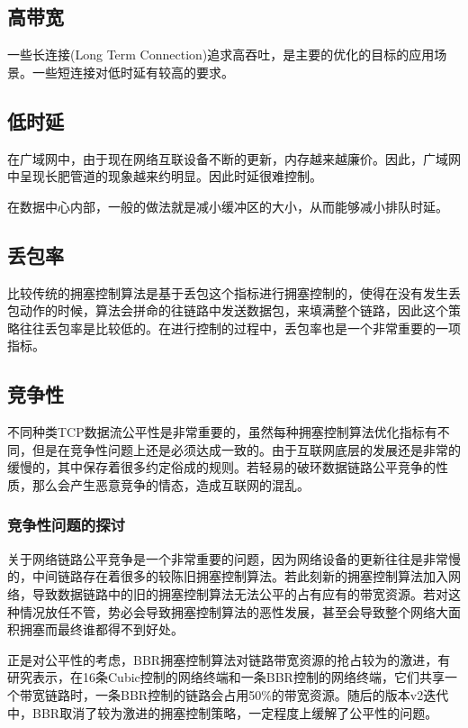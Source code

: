 \documentclass[a4paper, 12pt, UTF8]{ctexart}
\begin{document}
\subsection{高带宽}
\par 一些长连接(Long Term Connection)追求高吞吐，是主要的优化的目标的应用场景。一些短连接对低时延有较高的要求。
\subsection{低时延}
\par 在广域网中，由于现在网络互联设备不断的更新，内存越来越廉价。因此，广域网中呈现长肥管道的现象越来约明显。因此时延很难控制。

\par 在数据中心内部，一般的做法就是减小缓冲区的大小，从而能够减小排队时延。

\subsection{丢包率}
\par 比较传统的拥塞控制算法是基于丢包这个指标进行拥塞控制的，使得在没有发生丢包动作的时候，算法会拼命的往链路中发送数据包，来填满整个链路，因此这个策略往往丢包率是比较低的。在进行控制的过程中，丢包率也是一个非常重要的一项指标。

\subsection{竞争性}

\par 不同种类TCP数据流\cite{DBLP:conf/imc/WareMSS19}公平性是非常重要的，虽然每种拥塞控制算法优化指标有不同，但是在竞争性问题上还是必须达成一致的。由于互联网底层的发展还是非常的缓慢的，其中保存着很多约定俗成的规则。若轻易的破环数据链路公平竞争的性质，那么会产生恶意竞争的情态，造成互联网的混乱。

\subsubsection{竞争性问题的探讨}
\par 关于网络链路公平竞争是一个非常重要的问题，因为网络设备的更新往往是非常慢的，中间链路存在着很多的较陈旧拥塞控制算法。若此刻新的拥塞控制算法加入网络，导致数据链路中的旧的拥塞控制算法无法公平的占有应有的带宽资源。若对这种情况放任不管，势必会导致拥塞控制算法的恶性发展，甚至会导致整个网络大面积拥塞而最终谁都得不到好处。

\par 正是对公平性的考虑，BBR拥塞控制算法对链路带宽资源的抢占较为的激进，有研究表示\cite{DBLP:conf/sigcomm/SivaramanWTB14}，在16条Cubic控制的网络终端和一条BBR控制的网络终端，它们共享一个带宽链路时，一条BBR控制的链路会占用50\%的带宽资源。随后的版本v2\cite{bbrv2}迭代中，BBR取消了较为激进的拥塞控制策略，一定程度上缓解了公平性的问题。
\end{document}
